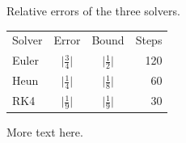 \documentclass{article}
\begin{document}
Relative errors of the three solvers.

\begin{tabular}{lccr}
Solver & Error & Bound & Steps \\
Euler & $\Bigg|\frac{3}{4}\Bigg|$ & $\Bigg|\frac{1}{2}\Bigg|$ & 120 \\
Heun & $\Bigg|\frac{1}{4}\Bigg|$ & $\Bigg|\frac{1}{8}\Bigg|$ & 60 \\
RK4 & $\Bigg|\frac{1}{9}\Bigg|$ & $\Bigg|\frac{1}{9}\Bigg|$ & 30 \\
\end{tabular}

More text here.
\end{document}
